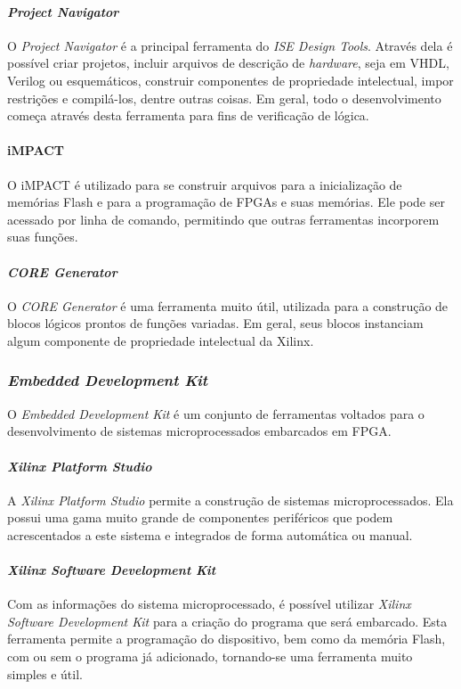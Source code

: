 \documentclass[11pt,a4paper,oneside]{book}
\begin{document}
\paragraph{\textit{Project Navigator}} O \textit{Project Navigator} é a principal ferramenta do \textit{ISE Design Tools}.
Através dela é possível criar projetos, incluir arquivos de descrição de \textit{hardware}, seja em VHDL, Verilog ou esquemáticos, construir componentes de propriedade intelectual, impor restrições e compilá-los, dentre outras coisas.
Em geral, todo o desenvolvimento começa através desta ferramenta para fins de verificação de lógica.

\paragraph{iMPACT}
O iMPACT é utilizado para se construir arquivos para a inicialização de memórias Flash e para a programação de FPGAs e suas memórias.
Ele pode ser acessado por linha de comando, permitindo que outras ferramentas incorporem suas funções.

\paragraph{\textit{CORE Generator}}
O \textit{CORE Generator} é uma ferramenta muito útil, utilizada para a construção de blocos lógicos prontos de funções variadas.
Em geral, seus blocos instanciam algum componente de propriedade intelectual da Xilinx.

\subsubsection{\textit{Embedded Development Kit}}
O \textit{Embedded Development Kit} é um conjunto de ferramentas voltados para o desenvolvimento de sistemas microprocessados embarcados em FPGA.

\paragraph{\textit{Xilinx Platform Studio}}
A \textit{Xilinx Platform Studio} permite a construção de sistemas microprocessados.
Ela possui uma gama muito grande de componentes periféricos que podem acrescentados a este sistema e integrados de forma automática ou manual.

\paragraph{\textit{Xilinx Software Development Kit}}
Com as informações do sistema microprocessado, é possível utilizar \textit{Xilinx Software Development Kit} para a criação do programa que será embarcado.
Esta ferramenta permite a programação do dispositivo, bem como da memória Flash, com ou sem o programa já adicionado, tornando-se uma ferramenta muito simples e útil.
\end{document}
